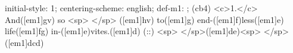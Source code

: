 initial-style: 1;
centering-scheme: english;
def-m1: \grealign;
(cb4) <c>1.</c> And([em1]gv) so <sp> </sp> ([em1]hv) to([em1]g) end-([em1]f)less([em1]e) life([em1]fg) in-([em1]e)vites.([em1]d) (::) <sp> </sp>([em1]de)<sp> </sp>([em1]dcd)